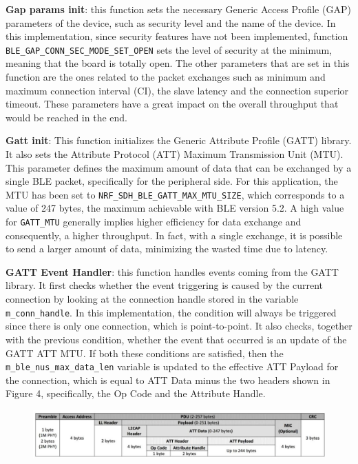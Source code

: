 \documentclass{Configuration_Files/PoliMi3i_thesis}
\begin{document}
\textbf{Gap params init}: this function sets the necessary Generic Access Profile (GAP) parameters of the device, such as security level and the name of the device. In this implementation, since security features have not been implemented, function \texttt{BLE\_GAP\_CONN\_SEC\_MODE\_SET\_OPEN} sets the level of security at the minimum, meaning that the board is totally open. The other parameters that are set in this function are the ones related to the packet exchanges such as minimum and maximum connection interval (CI), the slave latency and the connection superior timeout. These parameters have a great impact on the overall throughput that would be reached in the end.

\textbf{Gatt init}: This function initializes the Generic Attribute Profile (GATT) library. It also sets the Attribute Protocol (ATT) Maximum Transmission Unit (MTU). This parameter defines the maximum amount of data that can be exchanged by a single BLE packet, specifically for the peripheral side. For this application, the MTU has been set to \texttt{NRF\_SDH\_BLE\_GATT\_MAX\_MTU\_SIZE}, which corresponds to a value of 247 bytes, the maximum achievable with BLE version 5.2. A high value for \texttt{GATT\_MTU} generally implies higher efficiency for data exchange and consequently, a higher throughput. In fact, with a single exchange, it is possible to send a larger amount of data, minimizing the wasted time due to latency.

\textbf{GATT Event Handler}: this function handles events coming from the GATT library. It first checks whether the event triggering is caused by the current connection by looking at the connection handle stored in the variable \texttt{m\_conn\_handle}. In this implementation, the condition will always be triggered since there is only one connection, which is point-to-point. It also checks, together with the previous condition, whether the event that occurred is an update of the GATT ATT MTU. If both these conditions are satisfied, then the \texttt{m\_ble\_nus\_max\_data\_len} variable is updated to the effective ATT Payload for the connection, which is equal to ATT Data minus the two headers shown in Figure 4, specifically, the Op Code and the Attribute Handle.

\begin{figure}[H]
	\includegraphics[scale=0.3]{Previous Implementation/Screenshot 2024-08-15 at 11.00.56.png}
	\centering
\end{figure}
\end{document}
